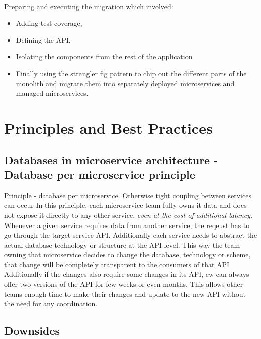 \paragraph{}
Preparing and executing the migration which involved:

\begin{itemize}
    \item Adding test coverage,
    \item Defining the API,
    \item Isolating the components from the rest of the application
    \item Finally using the strangler fig pattern to chip out the different parts of the monolith and migrate them into separately deployed microservices and managed microservices.
\end{itemize}


\section{Principles and Best Practices}

\subsection{Databases in microservice architecture - Database per microservice principle}
Principle - database per microservice. Otherwise tight coupling between services can occur
In this principle, each microservice team fully owns it data and does not expose it directly to any other service, \textit{even at the cost of additional latency}.
Whenever a given service requires data from another service, the reqeust has to go through the target service API.
Additionally each service needs to abstract the actual database technology or structure at the API level.
This way the team owning that microservice decides to change the database, technology or scheme, that change will be completely transparent to the consumers of that API
Additionally if the changes also require some changes in its API, ew can always offer two versions of the API for few weeks or even months.
This allows other teams enough time to make their changes and update to the new API without the need for any coordination.

\subsection{Downsides}


